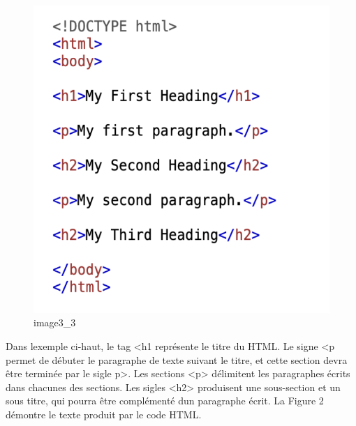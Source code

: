 \documentclass[
  letterpaper,
  DIV=11,
  numbers=noendperiod]{scrreprt}
\begin{document}
\begin{figure}[H]

{\centering \includegraphics{images/chapitre5_html_input.png}

}

\caption{image3\_3}

\end{figure}%

Dans l\textquotesingle exemple ci-haut, le tag \textless h1 représente
le titre du HTML. Le signe \textless p permet de débuter le paragraphe
de texte suivant le titre, et cette section devra être terminée par le
sigle p\textgreater. Les sections \textless p\textgreater{} délimitent
les paragraphes écrits dans chacunes des sections. Les sigles
\textless h2\textgreater{} produisent une sous-section et un sous titre,
qui pourra être complémenté d\textquotesingle un paragraphe écrit. La
Figure 2 démontre le texte produit par le code HTML.
\end{document}
